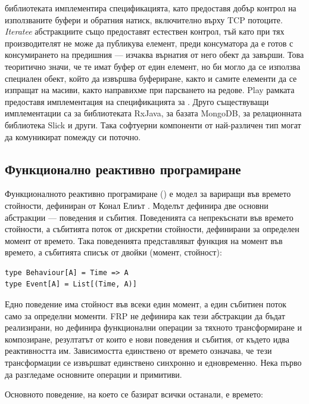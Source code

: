 библиотеката имплементира спецификацията, като предоставя добър контрол на използваните буфери и обратния натиск, включително върху TCP потоците. \emph{Iteratee} абстракциите също предоставят естествен контрол, тъй като при тях производителят не може да публикува елемент, преди консуматора да е готов с консумирането на предишния — изчаква върнатия от него  обект да завърши. Това теоритично значи, че те имат буфер от един елемент, но би могло да се използва специален  обект, който да извършва буфериране, както и самите елементи да се изпращат на масиви, както направихме при парсването на редове. Play рамката предоставя имплементация на спецификацията за . Друго съществуващи имплементации са за библиотеката RxJava, за базата MongoDB, за релационната библиотека Slick и други. Така софтуерни компоненти от най-различен тип могат да комуникират помежду си поточно.

\subsection{Функционално реактивно програмиране}

Функционалното реактивно програмиране () е модел за вариращи във времето стойности, дефиниран от Конал Елиът \cite{elliott2009PushPullFRP}. Моделът дефинира две основни абстракции — поведения и събития. Поведенията са непрекъснати във времето стойности, а събитията поток от дискретни стойности, дефинирани за определен момент от времето. Така поведенията представляват функция на момент във времето, а събитията списък от двойки (момент, стойност):

\begin{lstlisting}
type Behaviour[A] = Time => A
type Event[A] = List[(Time, A)]
\end{lstlisting}

Едно поведение има стойност във всеки един момент, а един събитиен поток само за определни моменти. FRP не дефинира как тези абстракции да бъдат реализирани, но дефинира функционални операции за тяхното трансформиране и композиране, резултатът от които е нови поведения и събития, от където идва реактивността им. Зависимостта единствено от времето означава, че тези трансформации се извършват единствено синхронно и едновременно. Нека първо да разгледаме основните операции и примитиви.

Основното поведение, на което се базират всички останали, е времето: 


